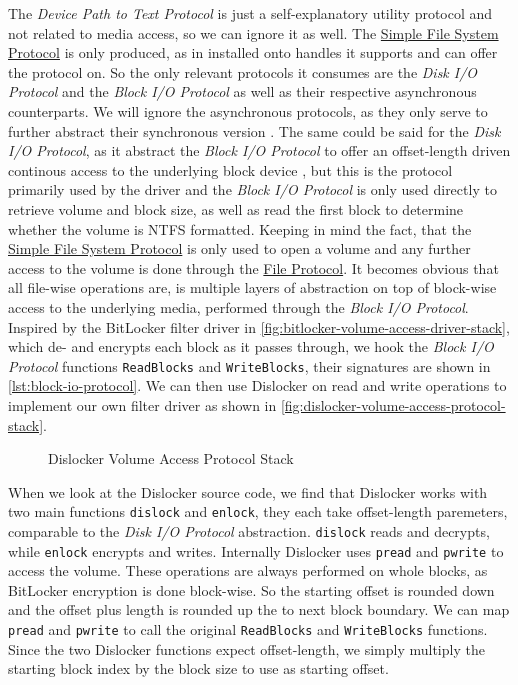 The \emph{Device Path to Text Protocol} is just a self-explanatory utility protocol and not related to media access, so we can ignore it as well.
The \hyperref[lst:simple-filesytem-protocol]{Simple File System Protocol} is only produced, as in installed onto handles it supports and can offer the protocol on.
So the only relevant protocols it consumes are the \emph{Disk \ac{I/O} Protocol} and the \emph{Block \ac{I/O} Protocol} as well as their respective asynchronous counterparts.
We will ignore the asynchronous protocols, as they only serve to further abstract their synchronous version \cite[13.8 and 13.10]{uefi-spec}.
The same could be said for the \emph{Disk \ac{I/O} Protocol}, as it abstract the \emph{Block \ac{I/O} Protocol} to offer an offset-length driven continous access to the underlying block device \cite[13.7]{uefi-spec}, but this is the protocol primarily used by the driver and the \emph{Block \ac{I/O} Protocol} is only used directly to retrieve volume and block size, as well as read the first block to determine whether the volume is \ac{NTFS} formatted.
Keeping in mind the fact, that the \hyperref[lst:simple-filesytem-protocol]{Simple File System Protocol} is only used to open a volume and any further access to the volume is done through the \hyperref[lst:file-protocol]{File Protocol}.
It becomes obvious that all file-wise operations are, is multiple layers of abstraction on top of block-wise access to the underlying media, performed through the \emph{Block \ac{I/O} Protocol}.
Inspired by the BitLocker filter driver in \autoref{fig:bitlocker-volume-access-driver-stack}, which de- and encrypts each block as it passes through, we hook the \emph{Block \ac{I/O} Protocol} functions \lstinline{ReadBlocks} and \lstinline{WriteBlocks}, their signatures are shown in \autoref{lst:block-io-protocol}.
We can then use Dislocker on read and write operations to implement our own filter driver as shown in \autoref{fig:dislocker-volume-access-protocol-stack}.


\begin{figure}[htb]%
    \centering
    
    \caption{Dislocker Volume Access Protocol Stack}%
    \label{fig:dislocker-volume-access-protocol-stack}%
\end{figure}

When we look at the Dislocker source code, we find that Dislocker works with two main functions \lstinline{dislock} and \lstinline{enlock}, they each take offset-length paremeters, comparable to the \emph{Disk \ac{I/O} Protocol} abstraction.
\lstinline{dislock} reads and decrypts, while \lstinline{enlock} encrypts and writes.
Internally Dislocker uses \lstinline{pread} and \lstinline{pwrite} to access the volume.
These operations are always performed on whole blocks, as BitLocker encryption is done block-wise.
So the starting offset is rounded down and the offset plus length is rounded up the to next block boundary.
We can map \lstinline{pread} and \lstinline{pwrite} to call the original \lstinline{ReadBlocks} and \lstinline{WriteBlocks} functions.
Since the two Dislocker functions expect offset-length, we simply multiply the starting block index by the block size to use as starting offset.


